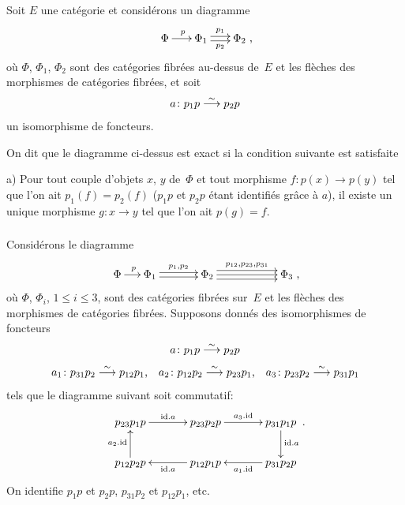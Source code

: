 \enlargethispage{.5cm}
\skpt
\begin{definitions}
\label{XIII.1.10}

\subsubsection{}
\label{XIII.1.10.1}
Soit $E$ une cat\'egorie et consid\'erons un diagramme
$$
\xymatrix@C=.6cm{{\Phi}\ar[r]^p&{\Phi_1}\ar@<2pt>[r]^{p_1}\ar@<-2pt>[r]_{p_2}&{\Phi_2}} \text{,}
$$
o\`u $\Phi$, $\Phi_1$, $\Phi_2$ sont des cat\'egories fibr\'ees
au-dessus de~$E$ et les fl\`eches des morphismes de cat\'egories
fibr\'ees, et soit
$$
a \colon p_1 p \overset{\sim}{\longrightarrow} p_2 p
$$
un isomorphisme de foncteurs.

On dit que le diagramme ci-dessus est exact si la condition suivante
est satisfaite

a) Pour tout couple d'objets $x$, $y$ de~$\Phi$ et tout morphisme $f
\colon p(x) \to p(y)$ tel que l'on ait $p_1(f) = p_2(f)$ ($p_1p$ et
$p_2p$ \'etant identifi\'es gr\^ace \`a $a$), il existe un
unique morphisme $g \colon x \to y$ tel que l'on ait $p(g)=f$.

\subsubsection{}
\label{XIII.1.10.2}
Consid\'erons le diagramme
$$
\xymatrix@C=.5cm{{\Phi}\ar[r]^p&{\Phi_1}\ar@<2pt>[rr]^{p_1,p_2}\ar@<-2pt>[rr]&&{\Phi_2}\ar@<4pt>[rrr]^{p_{12},p_{23},p_{31}}\ar[rrr]\ar@<-4pt>[rrr]&&&{\Phi_3}} \text{,}
$$
o\`u
$\Phi$, $\Phi_i$, $1 \leqslant i \leqslant 3$, sont des cat\'egories
fibr\'ees sur~$E$ et les fl\`eches des morphismes de
cat\'egories fibr\'ees. Supposons donn\'es des isomorphismes de
foncteurs
$$
a \colon p_1 p \overset{\sim}{\longrightarrow} p_2 p
$$
$$
a_1 \colon p_{31} p_2 \overset{\sim}{\longrightarrow} p_{12} p_1 \text{,}\quad a_2 \colon p_{12}
p_2 \overset{\sim}{\longrightarrow} p_{23} p_1 \text{,}\quad a_3 \colon p_{23} p_2 \overset{\sim}{\longrightarrow}
p_{31}p_1
$$
tels que le diagramme suivant soit commutatif:
$$
\xymatrix@C=1.2cm{{p_{23} p_1 p}\ar[r]^{\id.a}&{p_{23} p_2 p}\ar[r]^{a_3.\id}&{p_{31} p_1 p}\ar[d]^{\id.a}\\{p_{12} p_2 p}\ar[u]^{a_2.\id}&{p_{12} p_1 p}\ar[l]^{\id.a}&{p_{31} p_2 p}\ar[l]^{a_1.\id}} \text{.}
$$
On identifie $p_1 p$ et $p_2 p$, $p_{31} p_2$ et $p_{12} p_1$, etc.


\end{definitions}
